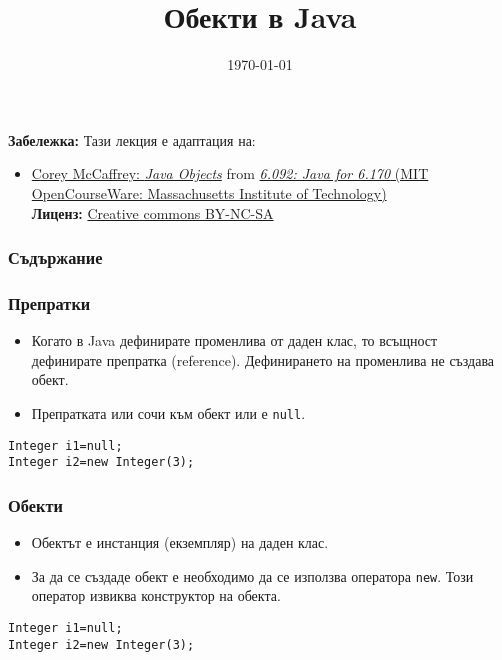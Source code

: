 \documentclass[ignorenonframetext, hyperref=unicode,compress]{beamer}
\title{Обекти в Java}
\date{\today}
\begin{document}
\frame{\titlepage}

\begin{frame}
\small
{\bf Забележка:} Тази лекция е адаптация на:
\begin{itemize}
  \item \href{http://ocw.mit.edu/NR/rdonlyres/Electrical-Engineering-and-Computer-Science/6-092January--IAP--2006/97145060-6EC3-44D9-9B9B-35B412CCAE45/0/lecture1b.pdf}{Corey McCaffrey: {\em Java Objects}} from
\href{http://ocw.mit.edu/OcwWeb/Electrical-Engineering-and-Computer-Science/6-092January--IAP--2006/CourseHome/index.htm}{
{\em 6.092: Java for 6.170} (MIT OpenCourseWare:
Massachusetts Institute of Technology)}\\
{\bf Лиценз:}
\href{http://ocw.mit.edu/OcwWeb/web/terms/terms/index.htm\#cc}{Creative commons
BY-NC-SA}  

\end{itemize}

\end{frame}

\begin{frame}
\frametitle{Съдържание}
\tableofcontents %
\end{frame}



\begin{frame}[containsverbatim]\frametitle{Препратки}
\begin{itemize}
 \item Когато в Java дефинирате променлива от даден клас, то всъщност дефинирате препратка (reference). 
Дефинирането на променлива не създава обект.
 \item Препратката или сочи към обект или е \lstinline{null}.
\end{itemize}

\begin{lstlisting}
Integer i1=null;
Integer i2=new Integer(3);
\end{lstlisting}
\end{frame}

\begin{frame}[containsverbatim]\frametitle{Обекти}
\begin{itemize}
 \item Обектът е инстанция (екземпляр) на даден клас.
 \item За да се създаде обект е необходимо да се използва оператора \lstinline{new}. 
Този оператор извиква конструктор на обекта.
\end{itemize}

\begin{lstlisting}
Integer i1=null;
Integer i2=new Integer(3);
\end{lstlisting}
\end{frame}
\end{document}
